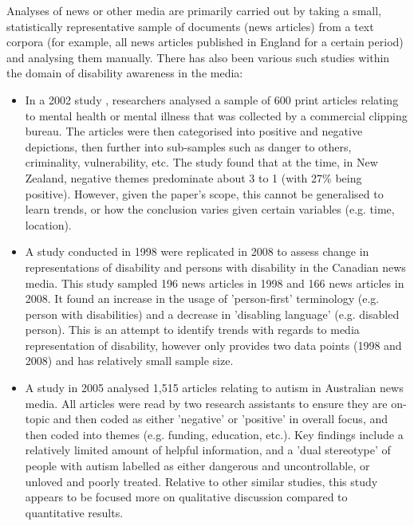 \documentclass{report}
\begin{document}
Analyses of news or other media are primarily carried out by taking a small, statistically representative sample of documents (news articles) from a text corpora (for example, all news articles published in England for a certain period) and analysing them manually. There has also been various such studies within the domain of disability awareness in the media:
\begin{itemize}
	\item In a 2002 study \cite{coverdale2002depictions}, researchers analysed a sample of 600 print articles relating to mental health or mental illness that was collected by a commercial clipping bureau.
		The articles were then categorised into positive and negative depictions, then further into sub-samples such as danger to others, criminality, vulnerability, etc.
		The study found that at the time, in New Zealand, negative themes predominate about 3 to 1 (with 27\% being positive).
		However, given the paper's scope, this cannot be generalised to learn trends, or how the conclusion varies given certain variables (e.g. time, location).
	\item A study conducted in 1998 \cite{gold1999media} were replicated in 2008 \cite{devotta2013representations} to assess change in representations of disability and persons with disability in the Canadian news media.
		This study sampled 196 news articles in 1998 and 166 news articles in 2008.
		It found an increase in the usage of 'person-first' terminology (e.g. person with disabilities) and a decrease in 'disabling language' (e.g. disabled person).
		This is an attempt to identify trends with regards to media representation of disability, however only provides two data points (1998 and 2008) and has relatively small sample size.
	\item A study in 2005 \cite{jones2009representations} analysed 1,515 articles relating to autism in Australian news media.
		All articles were read by two research assistants to ensure they are on-topic and then coded as either 'negative' or 'positive' in overall focus, and then coded into themes (e.g. funding, education, etc.).
		Key findings include a relatively limited amount of helpful information, and a 'dual stereotype' of people with autism labelled as either dangerous and uncontrollable, or unloved and poorly treated.
		Relative to other similar studies, this study appears to be focused more on qualitative discussion compared to quantitative results.
\end{itemize}
\end{document}
